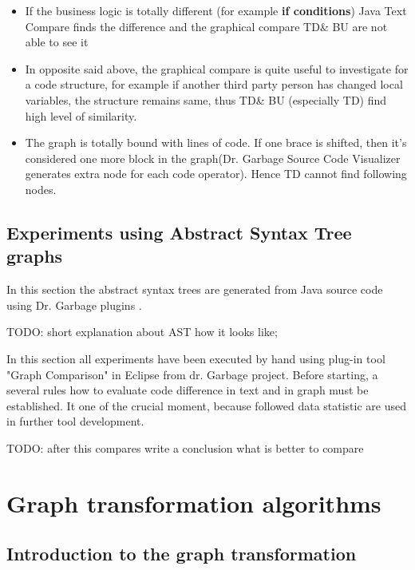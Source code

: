 \documentclass{report}
\begin{document}
\begin{itemize}
	\item If the business logic is totally different (for example \textbf{if conditions}) Java Text Compare finds the difference and the graphical compare TD\& BU are not able to see it
	\item In opposite said above, the graphical compare is quite useful to investigate for a code structure, for example if another third party person has changed local variables, the structure remains same, thus TD\& BU (especially TD) find high level of similarity.
	\item The graph is totally bound with lines of code. If one brace is shifted, then it's considered one more block in the graph(Dr. Garbage Source Code Visualizer \cite{drgarbage} generates extra node for each code operator). Hence TD cannot find following nodes.
\end{itemize}

\section{Experiments using Abstract Syntax Tree graphs}

In this section the abstract syntax trees are generated from Java source code using Dr. Garbage plugins \cite{drgarbage}.

TODO: short explanation about AST how it looks like;

In this section all experiments have been executed by hand using plug-in tool "Graph Comparison" in Eclipse from dr. Garbage project.  Before starting, a several rules how to evaluate code difference in text and in graph must be established. It one of the crucial moment, because followed data statistic are used in further tool development.



TODO: after this compares write a conclusion what is better to compare


\chapter{Graph transformation algorithms}
\label{cha:Algorithms}

\section{Introduction to the graph transformation}
\end{document}
